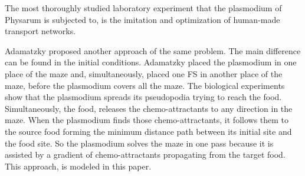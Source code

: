 The most thoroughly studied laboratory experiment that the plasmodium of Physarum is subjected to, is the imitation and optimization of human-made transport networks.

Adamatzky proposed another approach of the same problem. The main difference can be found in the
initial conditions. Adamatzky placed the plasmodium in
one place of the maze and, simultaneously, placed one FS
in another place of the maze, before the plasmodium
covers all the maze. The biological experiments show that
the plasmodium spreads its pseudopodia trying to reach
the food. Simultaneously, the food, releases the
chemo-attractants to any direction in the maze. When the
plasmodium finds those chemo-attractants, it follows
them to the source food forming the minimum distance
path between its initial site and the food site. So the
plasmodium solves the maze in one pass because it is
assisted by a gradient of chemo-attractants propagating
from the target food. This approach, is modeled in this
paper.